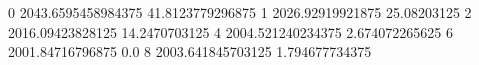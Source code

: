 0 2043.6595458984375 41.8123779296875
1 2026.92919921875 25.08203125
2 2016.09423828125 14.2470703125
4 2004.521240234375 2.674072265625
6 2001.84716796875 0.0
8 2003.641845703125 1.794677734375
